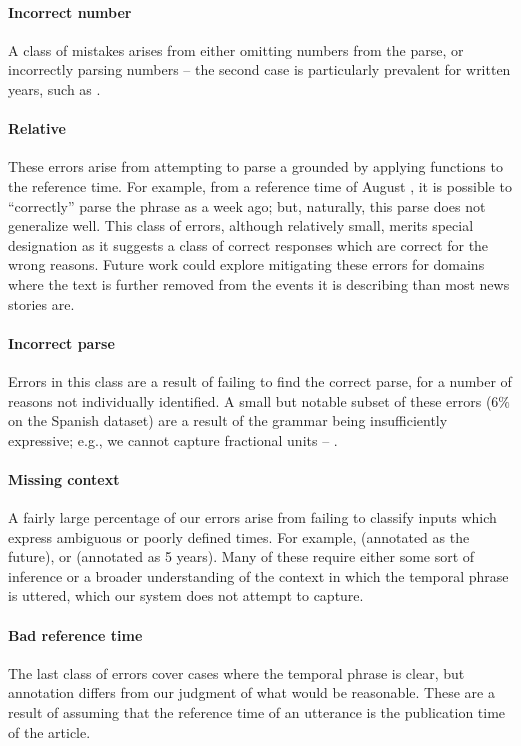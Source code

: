 \paragraph{Incorrect number}
A class of mistakes arises from either omitting numbers from the parse,
  or incorrectly parsing numbers -- the second case is particularly prevalent
  for written years, such as .

\paragraph{Relative }
These errors arise from attempting to parse a grounded  by applying
  functions to the reference time.
For example, from a reference time of August , it is possible to
  ``correctly''
  parse the phrase  as a week ago; but, naturally, this parse does
  not generalize well.
This class of errors, although relatively small, merits special designation
  as it suggests a class of correct responses which are correct for the wrong
  reasons.
Future work could explore mitigating these errors for domains
  where the text is further removed from the events it is describing
  than most news stories are.

\paragraph{Incorrect parse}
Errors in this class are a result of failing to find the correct parse,
  for a number of reasons not individually identified.
A small but notable subset of these errors ($6\%$ on the Spanish dataset)
  are a result of the grammar
  being insufficiently expressive; e.g., we cannot capture fractional
  units -- .

\paragraph{Missing context}
A fairly large percentage of our errors arise from failing to classify inputs
  which express ambiguous or poorly defined times.
For example,  (annotated as the future), or 
  (annotated as 5 years).
Many of these require either some sort of inference or
  a broader understanding of the context in which the
  temporal phrase is uttered, which our system does not attempt to capture.

\paragraph{Bad reference time}
The last class of errors cover cases where the temporal phrase is clear,
  but annotation differs from our judgment of what would be reasonable.
These are a result of assuming that the reference time of an utterance is
  the publication time of the article.
